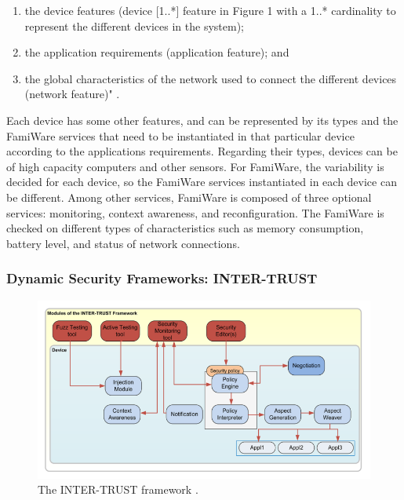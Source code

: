 \documentclass[12pt,a4paper,twoside]{report}
\begin{document}
\begin{enumerate}
	\item  the device features (device [1..*] feature in Figure 1 with a 1..* cardinality to represent the different devices in the system); 
	\item the application requirements (application feature); and 
	\item the global characteristics of the network used to connect the different devices (network feature)" \cite{Pinto;etal:2013}.
\end{enumerate}
Each device has some other features, and can be represented by its types and the FamiWare services that need to be instantiated in that particular device according to the applications requirements. Regarding their types, devices can be of high capacity computers and other sensors. For FamiWare, the variability is decided for each device, so the FamiWare services instantiated in each device can be different. Among other services, FamiWare is composed of three optional services: monitoring, context awareness, and reconfiguration. The FamiWare is checked on different types of characteristics such as memory consumption, battery level, and status of network connections.\par
\subsubsection{Dynamic Security Frameworks: INTER-TRUST}
\begin{figure}[ht]
	\begin{center}
  \includegraphics[width=1.0\textwidth,natwidth=769,natheight=412]{./figures/figure-02.png}
  \end{center}
  \caption{The INTER-TRUST framework \cite{ayed;etal:2013}.}
  \label{fig:label}
\end{figure}
\end{document}
